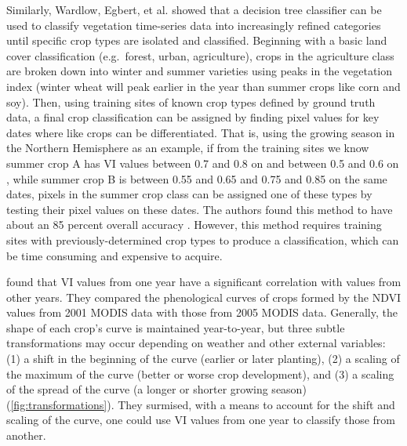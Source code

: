 Similarly, Wardlow, Egbert, et al. \autocites{wardlow2002discriminating}{wardlow2005state-level}{wardlow2007analysis}{wardlow2008large-area} showed that a decision tree classifier can be used to classify vegetation time-series data into increasingly refined categories until specific crop types are isolated and classified. Beginning with a basic land cover classification (e.g.\ forest, urban, agriculture), crops in the agriculture class are broken down into winter and summer varieties using peaks in the vegetation index (winter wheat will peak earlier in the year than summer crops like corn and soy). Then, using training sites of known crop types defined by ground truth data, a final crop classification can be assigned by finding pixel values for key dates where like crops can be differentiated. That is, using the growing season in the Northern Hemisphere as an example, if from the training sites we know summer crop A has VI values between 0.7 and 0.8 on  and between 0.5 and 0.6 on , while summer crop B is between 0.55 and 0.65 and 0.75 and 0.85 on the same dates, pixels in the summer crop class can be assigned one of these types by testing their pixel values on these dates. The authors found this method to have about an 85 percent overall accuracy \autocite{wardlow2005state-level}. However, this method requires training sites with previously-determined crop types to produce a classification, which can be time consuming and expensive to acquire.

\textcite{masialeti2010a-comparative} found that VI values from one year have a significant correlation with values from other years. They compared the phenological curves of crops formed by the NDVI values from 2001 MODIS data \autocite[from][]{wardlow2005state-level} with those from 2005 MODIS data. Generally, the shape of each crop's curve is maintained year-to-year, but three subtle transformations may occur depending on weather and other external variables: (1) a shift in the beginning of the curve (earlier or later planting), (2) a scaling of the maximum of the curve (better or worse crop development), and (3) a scaling of the spread of the curve (a longer or shorter growing season) (\autoref{fig:transformations}). They surmised, with a means to account for the shift and scaling of the curve, one could use VI values from one year to classify those from another.

